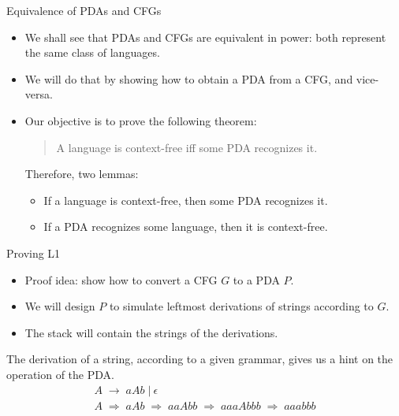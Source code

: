 \documentclass{prosper}%
\newcommand{\e} {{\mbox{$\epsilon$}}}
\newcommand{\ra}{\mbox{$\;\rightarrow\;$}}
\newcommand{\vb}{\mbox{$\;|\:$}}
\newcommand{\dra}{\mbox{$\;\Rightarrow\;$}}
\begin{document}
\begin{comment}
\begin{slide}{PDA conversion: example}
Consider the PDA $P$ below and its language $L_f(P)$. Convert $P$ to another PDA $P_1$ that accepts by empty stack such that $L_f(P)=L_e(P_1)$
\begin{center}
\texttt{[image: figures/pda2new.eps]}
\end{center}
\end{slide}
\end{comment}

\begin{slide}{Equivalence of PDAs and CFGs}
\begin{itemize}
\item We shall see that PDAs and CFGs are equivalent in power: both represent the same class of languages.
\item We will do that by showing how to obtain a PDA from a CFG, and vice-versa.
\item Our objective is to prove the following theorem:
{\em \begin{quote}
A language is context-free {\large\blue iff} some PDA recognizes it.
\end{quote}}
Therefore, two lemmas:
\begin{itemize}
\item[{\blue\bf L1}:] If a language is context-free, then some PDA recognizes it.
\item[{\blue\bf L2}:] If a PDA recognizes some language, then it is context-free.
\end{itemize}
\end{itemize}
\end{slide}

\begin{slide}{Proving L1}
\begin{itemize}
\item Proof idea: show how to convert a CFG $G$ to a PDA $P$.
\item We will design $P$ to simulate leftmost derivations of strings according to $G$.
\item The stack will contain the strings of the derivations.
\end{itemize}
The derivation of a string, according to a given grammar, gives us a hint on the operation of the PDA.
\[
\begin{array}{l}
A\ra aAb \vb \e\\
A\dra aAb\dra aaAbb \dra aaaAbbb \dra aaabbb
\end{array}
\]
\end{slide}
\end{document}
